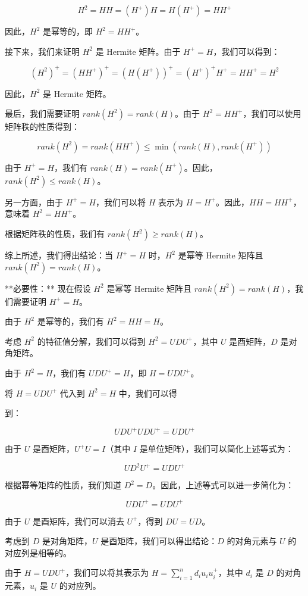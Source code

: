 \documentclass[11pt,letterpaper]{ctexart}
\begin{document}
\begin{enumerate}
$$H^2 = HH = (H^{+})H = H(H^{+}) = HH^{+}$$

因此，$H^2$ 是幂等的，即 $H^2 = HH^{+}$。

接下来，我们来证明 $H^2$ 是 Hermite 矩阵。由于 $H^{+} = H$，我们可以得到：

$$(H^2)^{+} = (HH^{+})^{+} = (H(H^{+}))^{+} = (H^{+})^{+}H^{+} = HH^{+} = H^2$$

因此，$H^2$ 是 Hermite 矩阵。

最后，我们需要证明 $rank(H^2) = rank(H)$。由于 $H^2 = HH^{+}$，我们可以使用矩阵秩的性质得到：

$$rank(H^2) = rank(HH^{+}) \leq \min(rank(H), rank(H^{+}))$$

由于 $H^{+} = H$，我们有 $rank(H) = rank(H^{+})$。因此，$rank(H^2) \leq rank(H)$。

另一方面，由于 $H^{+} = H$，我们可以将 $H$ 表示为 $H = H^{+}$。因此，$HH = HH^{+}$，意味着 $H^2 = HH^{+}$。

根据矩阵秩的性质，我们有 $rank(H^2) \geq rank(H)$。

综上所述，我们得出结论：当 $H^{+} = H$ 时，$H^2$ 是幂等 Hermite 矩阵且 $rank(H^2) = rank(H)$。

**必要性：** 现在假设 $H^2$ 是幂等 Hermite 矩阵且 $rank(H^2) = rank(H)$，我们需要证明 $H^{+} = H$。

由于 $H^2$ 是幂等的，我们有 $H^2 = HH = H$。

考虑 $H^2$ 的特征值分解，我们可以得到 $H^2 = UDU^{+}$，其中 $U$ 是酉矩阵，$D$ 是对角矩阵。

由于 $H^2 = H$，我们有 $UDU^{+} = H$，即 $H = UDU^{+}$。

将 $H = UDU^{+}$ 代入到 $H^2 = H$ 中，我们可以得

到：

$$UDU^{+}UDU^{+} = UDU^{+}$$

由于 $U$ 是酉矩阵，$U^{+}U = I$（其中 $I$ 是单位矩阵），我们可以简化上述等式为：

$$UD^2U^{+} = UDU^{+}$$

根据幂等矩阵的性质，我们知道 $D^2 = D$。因此，上述等式可以进一步简化为：

$$UDU^{+} = UDU^{+}$$

由于 $U$ 是酉矩阵，我们可以消去 $U^{+}$，得到 $DU = UD$。

考虑到 $D$ 是对角矩阵，$U$ 是酉矩阵，我们可以得出结论：$D$ 的对角元素与 $U$ 的对应列是相等的。

由于 $H = UDU^{+}$，我们可以将其表示为 $H = \sum_{i=1}^n d_i u_i u_i^{+}$，其中 $d_i$ 是 $D$ 的对角元素，$u_i$ 是 $U$ 的对应列。


\end{enumerate}
\end{document}
